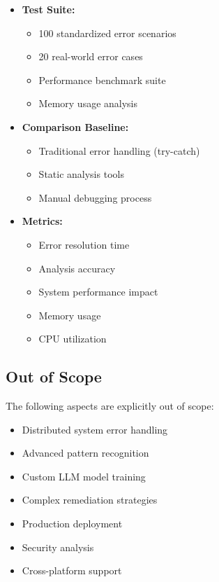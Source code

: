 \begin{itemize}
    \item \textbf{Test Suite:}
    \begin{itemize}
        \item 100 standardized error scenarios
        \item 20 real-world error cases
        \item Performance benchmark suite
        \item Memory usage analysis
    \end{itemize}
    \item \textbf{Comparison Baseline:}
    \begin{itemize}
        \item Traditional error handling (try-catch)
        \item Static analysis tools
        \item Manual debugging process
    \end{itemize}
    \item \textbf{Metrics:}
    \begin{itemize}
        \item Error resolution time
        \item Analysis accuracy
        \item System performance impact
        \item Memory usage
        \item CPU utilization
    \end{itemize}
\end{itemize}

\subsection{Out of Scope}
The following aspects are explicitly out of scope:

\begin{itemize}
    \item Distributed system error handling
    \item Advanced pattern recognition
    \item Custom LLM model training
    \item Complex remediation strategies
    \item Production deployment
    \item Security analysis
    \item Cross-platform support
\end{itemize}

